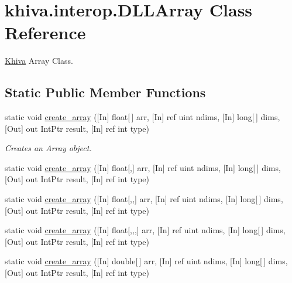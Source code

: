 \hypertarget{classkhiva_1_1interop_1_1_d_l_l_array}{}\section{khiva.\+interop.\+D\+L\+L\+Array Class Reference}
\label{classkhiva_1_1interop_1_1_d_l_l_array}


\mbox{\hyperlink{classkhiva_1_1_khiva}{Khiva}} Array Class.  


\subsection*{Static Public Member Functions}
\begin{DoxyCompactItemize}
\item 
static void \mbox{\hyperlink{classkhiva_1_1interop_1_1_d_l_l_array_aef88578891fc8cf10a37806e6782184c}{create\+\_\+array}} (\mbox{[}In\mbox{]} float\mbox{[}$\,$\mbox{]} arr, \mbox{[}In\mbox{]} ref uint ndims, \mbox{[}In\mbox{]} long\mbox{[}$\,$\mbox{]} dims, \mbox{[}Out\mbox{]} out Int\+Ptr result, \mbox{[}In\mbox{]} ref int type)
\begin{DoxyCompactList}\small\item\em Creates an Array object. \end{DoxyCompactList}\item 
static void \mbox{\hyperlink{classkhiva_1_1interop_1_1_d_l_l_array_a0d4fcc4e5da42f9461adbb9cede473ab}{create\+\_\+array}} (\mbox{[}In\mbox{]} float\mbox{[},\mbox{]} arr, \mbox{[}In\mbox{]} ref uint ndims, \mbox{[}In\mbox{]} long\mbox{[}$\,$\mbox{]} dims, \mbox{[}Out\mbox{]} out Int\+Ptr result, \mbox{[}In\mbox{]} ref int type)
\item 
static void \mbox{\hyperlink{classkhiva_1_1interop_1_1_d_l_l_array_ae0a90962e63d8353932a4c2dbbeb28a2}{create\+\_\+array}} (\mbox{[}In\mbox{]} float\mbox{[},,\mbox{]} arr, \mbox{[}In\mbox{]} ref uint ndims, \mbox{[}In\mbox{]} long\mbox{[}$\,$\mbox{]} dims, \mbox{[}Out\mbox{]} out Int\+Ptr result, \mbox{[}In\mbox{]} ref int type)
\item 
static void \mbox{\hyperlink{classkhiva_1_1interop_1_1_d_l_l_array_a528013431583f1908245a12d0dd4687d}{create\+\_\+array}} (\mbox{[}In\mbox{]} float\mbox{[},,,\mbox{]} arr, \mbox{[}In\mbox{]} ref uint ndims, \mbox{[}In\mbox{]} long\mbox{[}$\,$\mbox{]} dims, \mbox{[}Out\mbox{]} out Int\+Ptr result, \mbox{[}In\mbox{]} ref int type)
\item 
static void \mbox{\hyperlink{classkhiva_1_1interop_1_1_d_l_l_array_ac6e0b2907774bf20bae24c7b6306786c}{create\+\_\+array}} (\mbox{[}In\mbox{]} double\mbox{[}$\,$\mbox{]} arr, \mbox{[}In\mbox{]} ref uint ndims, \mbox{[}In\mbox{]} long\mbox{[}$\,$\mbox{]} dims, \mbox{[}Out\mbox{]} out Int\+Ptr result, \mbox{[}In\mbox{]} ref int type)

\end{DoxyCompactItemize}
